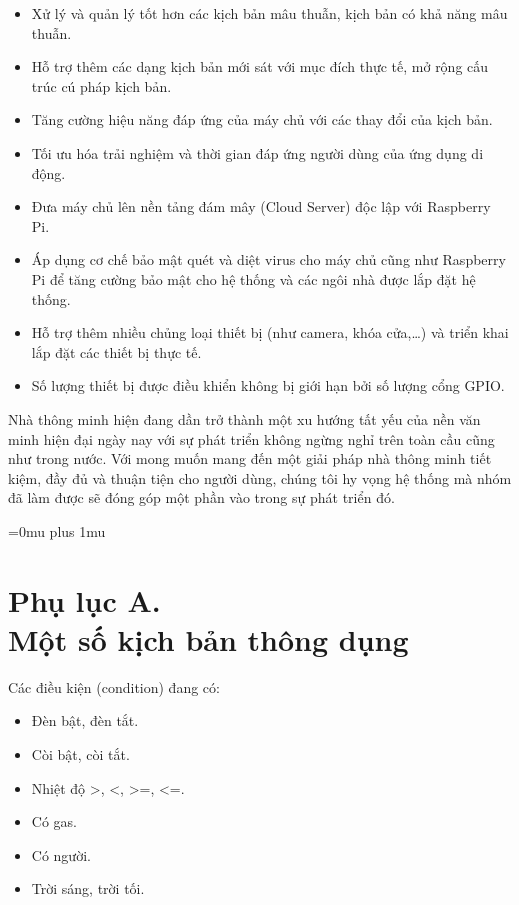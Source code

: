 \documentclass[12pt,a4paper,oneside]{extbook}
\begin{document}
\begin{itemize}[topsep=1mm,itemsep=-0.5mm]
\item Xử lý và quản lý tốt hơn các kịch bản mâu thuẫn, kịch bản có khả năng mâu thuẫn.
\item Hỗ trợ thêm các dạng kịch bản mới sát với mục đích thực tế, mở rộng cấu trúc cú pháp kịch bản.
\item Tăng cường hiệu năng đáp ứng của máy chủ với các thay đổi của kịch bản.
\item Tối ưu hóa trải nghiệm và thời gian đáp ứng người dùng của ứng dụng di động.
\item Đưa máy chủ lên nền tảng đám mây (Cloud Server) độc lập với Raspberry Pi.
\item Áp dụng cơ chế bảo mật quét và diệt virus cho máy chủ cũng như Raspberry Pi để tăng cường bảo mật cho hệ thống và các ngôi nhà được lắp đặt hệ thống.
\item Hỗ trợ thêm nhiều chủng loại thiết bị (như camera, khóa cửa,\dots) và triển khai lắp đặt các thiết bị thực tế.
\item Số lượng thiết bị được điều khiển không bị giới hạn bởi số lượng cổng GPIO.
\vspace{1mm}
\end{itemize}

\noindent
Nhà thông minh hiện đang dần trở thành một xu hướng tất yếu của nền văn minh hiện đại ngày nay với sự phát triển không ngừng nghỉ trên toàn cầu cũng như trong nước. Với mong muốn mang đến một giải pháp nhà thông minh tiết kiệm, đầy đủ và thuận tiện cho người dùng, chúng tôi hy vọng hệ thống mà nhóm đã làm được sẽ đóng góp một phần vào trong sự phát triển đó.


\newpage
\Urlmuskip=0mu plus 1mu\relax




\chapter*{Phụ lục A. \\Một số kịch bản thông dụng}
\thispagestyle{plain}

Các điều kiện (condition) đang có:

\begin{itemize}[topsep=1mm,itemsep=-0.5mm]
\item Đèn bật, đèn tắt.
\item Còi bật, còi tắt.
\item Nhiệt độ >, <, >=, <=.
\item Có gas.
\item Có người.
\item Trời sáng, trời tối.
\vspace{1mm}
\end{itemize}
\end{document}
